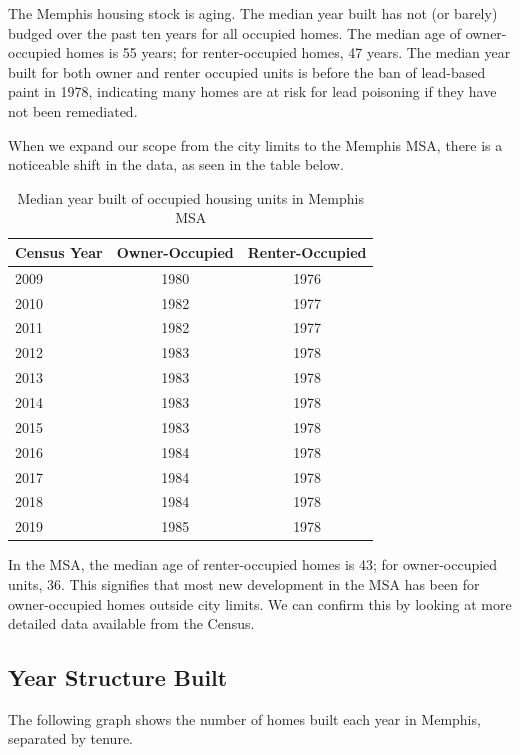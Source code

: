 \documentclass[
]{book}
\begin{document}
The Memphis housing stock is aging. The median year built has not (or barely) budged over the past ten years for all occupied homes. The median age of owner-occupied homes is 55 years; for renter-occupied homes, 47 years. The median year built for both owner and renter occupied units is before the ban of lead-based paint in 1978, indicating many homes are at risk for lead poisoning if they have not been remediated.

When we expand our scope from the city limits to the Memphis MSA, there is a noticeable shift in the data, as seen in the table below.

\begin{table}

\caption{\label{tab:tbl-medyrbltmsa}Median year built of occupied housing units in Memphis MSA}
\centering
\begin{tabular}[t]{l|c|c}
\hline
Census Year & Owner-Occupied & Renter-Occupied\\
\hline
2009 & 1980 & 1976\\
\hline
2010 & 1982 & 1977\\
\hline
2011 & 1982 & 1977\\
\hline
2012 & 1983 & 1978\\
\hline
2013 & 1983 & 1978\\
\hline
2014 & 1983 & 1978\\
\hline
2015 & 1983 & 1978\\
\hline
2016 & 1984 & 1978\\
\hline
2017 & 1984 & 1978\\
\hline
2018 & 1984 & 1978\\
\hline
2019 & 1985 & 1978\\
\hline
\end{tabular}
\end{table}

In the MSA, the median age of renter-occupied homes is 43; for owner-occupied units, 36. This signifies that most new development in the MSA has been for owner-occupied homes outside city limits. We can confirm this by looking at more detailed data available from the Census.

\hypertarget{year-structure-built}{%
\subsection{Year Structure Built}\label{year-structure-built}}

The following graph shows the number of homes built each year in Memphis, separated by tenure.
\end{document}
